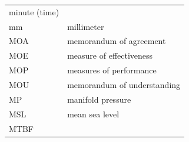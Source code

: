 \documentclass[
]{book}
\begin{document}
\begin{longtable}[]{@{}ll@{}}
\begin{minipage}[t]{0.47\columnwidth}
minute (time)\strut
\end{minipage}\tabularnewline
\begin{minipage}[t]{0.47\columnwidth}\raggedright
mm\strut
\end{minipage} & \begin{minipage}[t]{0.47\columnwidth}\raggedright
millimeter\strut
\end{minipage}\tabularnewline
\begin{minipage}[t]{0.47\columnwidth}\raggedright
MOA\strut
\end{minipage} & \begin{minipage}[t]{0.47\columnwidth}\raggedright
memorandum of agreement\strut
\end{minipage}\tabularnewline
\begin{minipage}[t]{0.47\columnwidth}\raggedright
MOE\strut
\end{minipage} & \begin{minipage}[t]{0.47\columnwidth}\raggedright
measure of effectiveness\strut
\end{minipage}\tabularnewline
\begin{minipage}[t]{0.47\columnwidth}\raggedright
MOP\strut
\end{minipage} & \begin{minipage}[t]{0.47\columnwidth}\raggedright
measures of performance\strut
\end{minipage}\tabularnewline
\begin{minipage}[t]{0.47\columnwidth}\raggedright
MOU\strut
\end{minipage} & \begin{minipage}[t]{0.47\columnwidth}\raggedright
memorandum of understanding\strut
\end{minipage}\tabularnewline
\begin{minipage}[t]{0.47\columnwidth}\raggedright
MP\strut
\end{minipage} & \begin{minipage}[t]{0.47\columnwidth}\raggedright
manifold pressure\strut
\end{minipage}\tabularnewline
\begin{minipage}[t]{0.47\columnwidth}\raggedright
MSL\strut
\end{minipage} & \begin{minipage}[t]{0.47\columnwidth}\raggedright
mean sea level\strut
\end{minipage}\tabularnewline
\begin{minipage}[t]{0.47\columnwidth}\raggedright
MTBF\strut
\end{minipage} & \begin{minipage}[t]{0.47\columnwidth}\raggedright

\end{minipage}
\end{longtable}
\end{document}
